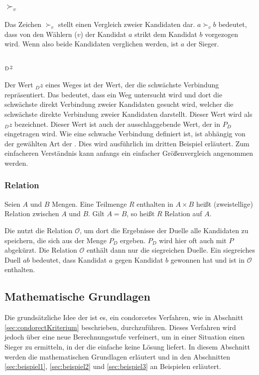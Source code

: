 \subsubsection{$\succ_{v}$}
\label{vv}
Das Zeichen $\succ_{v}$ stellt einen Vergleich zweier Kandidaten dar. $a \succ_{v}{ } b$ bedeutet, dass von den Wählern ($v$) der Kandidat $a$ strikt dem Kandidat $b$ vorgezogen wird. Wenn also beide Kandidaten verglichen werden, ist $a$ der Sieger.

\subsubsection{$\textsubscript{D}z$}
\label{dz}
Der Wert $_{D}z$ eines Weges ist der Wert, der die schwächste Verbindung repräsentiert. Das bedeutet, dass ein Weg untersucht wird und dort die schwächste direkt Verbindung zweier Kandidaten gesucht wird, welcher die schwächste direkte Verbindung zweier Kandidaten darstellt. Dieser Wert wird als $_{D}z$ bezeichnet. Dieser Wert ist auch der ausschlaggebende Wert, der in  $P_{D}$ eingetragen wird. Wie eine schwache Verbindung definiert ist, ist abhängig von der gewählten Art der \schulze. Dies wird ausführlich im dritten Beispiel erläutert. Zum einfacheren Verständnis kann anfangs ein einfacher Größenvergleich angenommen werden.


\subsubsection{Relation}
\label{relation}
\glqq Seien $A$ und $B$ Mengen. Eine Teilmenge $R$ enthalten in $A \times B$ heißt (zweistellige) Relation zwischen $A$ und $B$. Gilt $A = B$, so heißt $R$ Relation auf $A$.\grqq{} \citet{Lang2018}

Die \schulze nutzt die Relation $\mathcal{O}$, um dort die Ergebnisse der Duelle alle Kandidaten zu speichern, die sich aus der Menge $P_{D}$ ergeben. $P_{D}$ wird hier oft auch mit $P$ abgekürzt. Die  Relation $\mathcal{O}$ enthält dann nur die siegreichen Duelle. Ein siegreiches Duell $ab$ bedeutet, dass Kandidat $a$ gegen Kandidat $b$ gewonnen hat und ist in $\mathcal{O}$ enthalten.

\newpage
\subsection{Mathematische Grundlagen} 
\label{sec:theoretische Grundlagen}

Die grundsätzliche Idee der \schulze ist es, ein condorcetes Verfahren, wie in Abschnitt \ref{sec:condorectKriterium} beschrieben, durchzuführen. Dieses Verfahren wird jedoch über eine neue Berechnungsstufe verfeinert, um in einer Situation einen Sieger zu ermitteln, in der die einfache \condorcetMethode keine Lösung liefert. In diesem Abschnitt werden die mathematischen Grundlagen erläutert und in den Abschnitten \ref{sec:beispiel1},  \ref{sec:beispiel2} und \ref{sec:beispiel3} an Beispielen erläutert.



